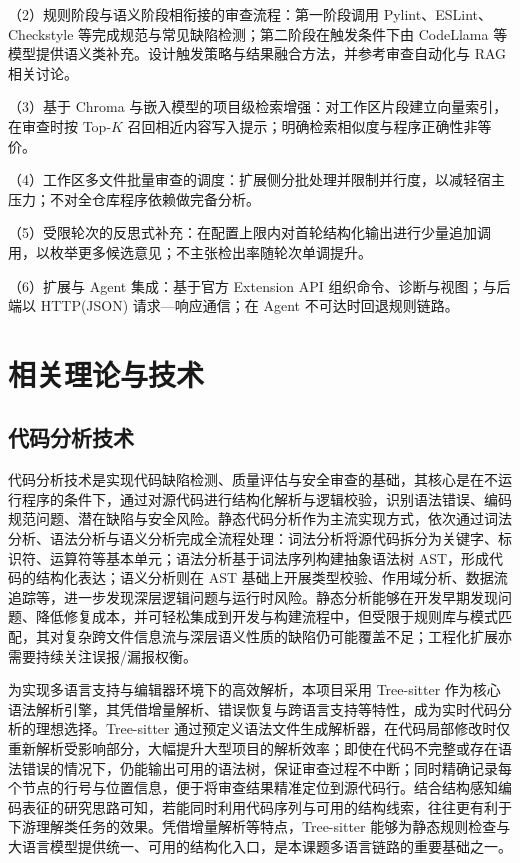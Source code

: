 （2）规则阶段与语义阶段相衔接的审查流程：第一阶段调用 Pylint、ESLint、Checkstyle 等完成规范与常见缺陷检测；第二阶段在触发条件下由 CodeLlama 等模型提供语义类补充\cite{roziere2023codellama}。设计触发策略与结果融合方法，并参考审查自动化与 RAG 相关讨论\cite{li2022codereviewer,lewis2020retrieval}。

（3）基于 Chroma 与嵌入模型的项目级检索增强：对工作区片段建立向量索引，在审查时按 Top-$K$ 召回相近内容写入提示；明确检索相似度与程序正确性非等价。

（4）工作区多文件批量审查的调度：扩展侧分批处理并限制并行度，以减轻宿主压力；不对全仓库程序依赖做完备分析。

（5）受限轮次的反思式补充：在配置上限内对首轮结构化输出进行少量追加调用，以枚举更多候选意见；不主张检出率随轮次单调提升。

（6）扩展与 Agent 集成：基于官方 Extension API 组织命令、诊断与视图\cite{microsoft2025vscodeapi}；与后端以 HTTP(JSON) 请求—响应通信；在 Agent 不可达时回退规则链路。

\newpage

\section{相关理论与技术}
\subsection{代码分析技术}
代码分析技术是实现代码缺陷检测、质量评估与安全审查的基础，其核心是在不运行程序的条件下，通过对源代码进行结构化解析与逻辑校验，识别语法错误、编码规范问题、潜在缺陷与安全风险。静态代码分析作为主流实现方式，依次通过词法分析、语法分析与语义分析完成全流程处理：词法分析将源代码拆分为关键字、标识符、运算符等基本单元；语法分析基于词法序列构建抽象语法树 AST，形成代码的结构化表达；语义分析则在 AST 基础上开展类型校验、作用域分析、数据流追踪等，进一步发现深层逻辑问题与运行时风险。静态分析能够在开发早期发现问题、降低修复成本，并可轻松集成到开发与构建流程中，但受限于规则库与模式匹配，其对复杂跨文件信息流与深层语义性质的缺陷仍可能覆盖不足；工程化扩展亦需要持续关注误报/漏报权衡\cite{sadowski2018scaling,bacchelli2013expectations}。

为实现多语言支持与编辑器环境下的高效解析，本项目采用 Tree-sitter 作为核心语法解析引擎，其凭借增量解析、错误恢复与跨语言支持等特性，成为实时代码分析的理想选择\cite{github2025treesitter}。Tree-sitter 通过预定义语法文件生成解析器，在代码局部修改时仅重新解析受影响部分，大幅提升大型项目的解析效率；即使在代码不完整或存在语法错误的情况下，仍能输出可用的语法树，保证审查过程不中断；同时精确记录每个节点的行号与位置信息，便于将审查结果精准定位到源代码行。结合结构感知编码表征的研究思路可知，若能同时利用代码序列与可用的结构线索，往往更有利于下游理解类任务的效果\cite{guo2020graphcodebert,feng2020codebert}。凭借增量解析等特点，Tree-sitter 能够为静态规则检查与大语言模型提供统一、可用的结构化入口，是本课题多语言链路的重要基础之一。

